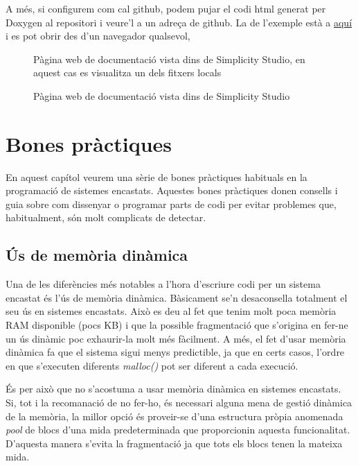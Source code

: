 A més, si configurem com cal github, podem pujar el codi html generat per Doxygen al repositori i veure'l a un adreça de github. La de l'exemple està a \href{https://mariusmm.github.io/cursembedded/Simplicity/FreeRTOS_1/Doc/html/}{aquí} \cite{GITHUBPages} i es pot obrir des d'un navegador qualsevol,

\begin{figure}
 \centering
 \caption{Pàgina web de documentació vista dins de Simplicity Studio}{Pàgina web de documentació vista dins de Simplicity Studio, en aquest cas es visualitza un dels fitxers locals}
 \label{fig:doxygeneclipse}
\end{figure}

\chapter{Bones pràctiques}

En aquest capítol veurem una sèrie de bones pràctiques habituals en la programació de sistemes encastats. Aquestes bones pràctiques donen consells i guia sobre com dissenyar o programar parts de codi per evitar problemes que, habitualment, són molt complicats de detectar.

\section{Ús de memòria dinàmica}
Una de les diferències més notables a l'hora d'escriure codi per un sistema encastat és l'ús de memòria dinàmica. Bàsicament se'n desaconsella totalment el seu ús en sistemes encastats. Això es deu al fet que tenim molt poca memòria RAM disponible (pocs KB) i que la possible fragmentació que s'origina en fer-ne un ús dinàmic poc exhaurir-la molt més fàcilment. A més, el fet d'usar memòria dinàmica fa que el sistema sigui menys predictible, ja que en certs casos, l'ordre en que s'executen diferents {\em malloc()} pot ser diferent a cada execució.

És per això que no s'acostuma a usar memòria dinàmica en sistemes encastats. Si, tot i la recomanació de no fer-ho, és necessari alguna mena de gestió dinàmica de la memòria, la millor opció és proveir-se d'una estructura pròpia {anomenada \em pool} de blocs d'una mida predeterminada que proporcionin aquesta funcionalitat. D'aquesta manera s'evita la fragmentació ja que tots els blocs tenen la mateixa mida.

